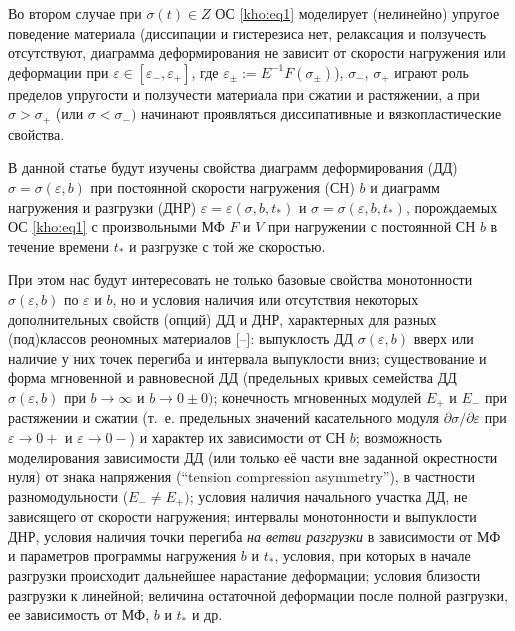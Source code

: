 Во втором случае при $\sigma(t)\in Z$ ОС \eqref{kho:eq1} моделирует (нелинейно) упругое поведение материала (диссипации и гистерезиса нет, релаксация и ползучесть отсутствуют, диаграмма деформирования не зависит от скорости нагружения или деформации при $\varepsilon\in[\varepsilon_{-},\varepsilon_{+}]$, где $\varepsilon_\pm:=E^{-1}F(\sigma_\pm)$), $\sigma_{-}$, $\sigma_{+}$ играют роль пределов упругости и ползучести материала при сжатии и растяжении, а при $\sigma>\sigma_{+}$ (или $\sigma<\sigma_{-})$ начинают проявляться диссипативные и вязкопластические свойства. 



В данной статье будут изучены свойства диаграмм деформирования (ДД) $\sigma=\sigma(\varepsilon,b)$ при постоянной скорости нагружения (СН) $b$ и диаграмм нагружения и разгрузки (ДНР) $\varepsilon=\varepsilon(\sigma,b,t_\ast)$ и $\sigma=\sigma(\varepsilon,b,t_\ast)$, порождаемых ОС \eqref{kho:eq1} с произвольными МФ $F$ и $V$ при нагружении с постоянной СН $b$ в течение времени $t_\ast $ и разгрузке с той же скоростью. 



При этом нас будут интересовать не только базовые свойства монотонности $\sigma(\varepsilon,b)$ по $\varepsilon$ и $b$, но и условия наличия или отсутствия некоторых дополнительных свойств (опций) ДД и ДНР, характерных для разных (под)классов реономных материалов [--]: выпуклость ДД $\sigma(\varepsilon,b)$ вверх или наличие у них точек перегиба и интервала выпуклости вниз; существование и форма мгновенной и равновесной ДД (предельных кривых семейства ДД $\sigma(\varepsilon,b)$ при $b\to\infty$ и $b\to0\pm0)$; конечность мгновенных модулей $E_{+}$ и $E_{-}$ при растяжении и сжатии (т.~е. предельных значений касательного модуля $\partial\sigma/\partial\varepsilon$ при $\varepsilon\to0+$ и $\varepsilon\to0-$) и характер их зависимости от СН $b$; возможность моделирования зависимости ДД (или только её части вне заданной окрестности нуля) от знака напряжения (``tension compression asymmetry''), в частности разномодульности ($E_{-}\ne E_{+})$; условия наличия начального участка ДД, не зависящего от скорости нагружения; интервалы монотонности и выпуклости ДНР, условия наличия точки перегиба \textit{на ветви разгрузки} в зависимости от МФ и параметров программы нагружения $b$ и $t_\ast$, условия, при которых в начале разгрузки происходит дальнейшее нарастание деформации; условия близости разгрузки к линейной; величина остаточной деформации после полной разгрузки, ее зависимость от МФ, $b$ и $t_\ast $ и др.



